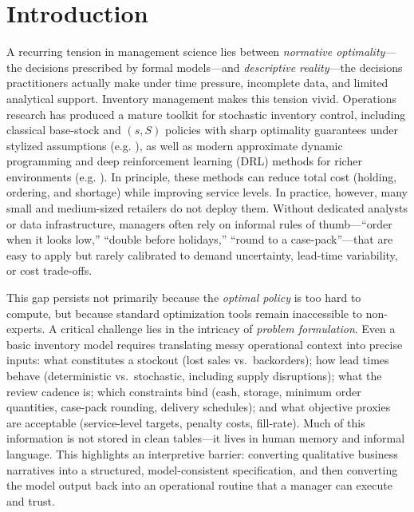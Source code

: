 \section{Introduction}
\label{sec:intro}

A recurring tension in management science lies between \emph{normative optimality}—the decisions prescribed by formal models—and \emph{descriptive reality}—the decisions practitioners actually make under time pressure, incomplete data, and limited analytical support. Inventory management makes this tension vivid. Operations research has produced a mature toolkit for stochastic inventory control, including classical base-stock and $(s,S)$ policies with sharp optimality guarantees under stylized assumptions (e.g. \cite{axsater2006inventory}), as well as modern approximate dynamic programming and deep reinforcement learning (DRL) methods for richer environments (e.g. \cite{madeka2022deep}). In principle, these methods can reduce total cost (holding, ordering, and shortage) while improving service levels. In practice, however, many small and medium-sized retailers do not deploy them. Without dedicated analysts or data infrastructure, managers often rely on informal rules of thumb—``order when it looks low,'' ``double before holidays,'' ``round to a case-pack''—that are easy to apply but rarely calibrated to demand uncertainty, lead-time variability, or cost trade-offs.

    


This gap persists not primarily because the \emph{optimal policy} is too hard to compute, but because standard optimization tools remain inaccessible to non-experts. A critical challenge lies in the intricacy of \emph{problem formulation}. Even a basic inventory model requires translating messy operational context into precise inputs: what constitutes a stockout (lost sales vs.\ backorders); how lead times behave (deterministic vs.\ stochastic, including supply disruptions); what the review cadence is; which constraints bind (cash, storage, minimum order quantities, case-pack rounding, delivery schedules); and what objective proxies are acceptable (service-level targets, penalty costs, fill-rate). Much of this information is not stored in clean tables—it lives in human memory and informal language. This highlights an interpretive barrier: converting qualitative business narratives into a structured, model-consistent specification, and then converting the model output back into an operational routine that a manager can execute and trust.





